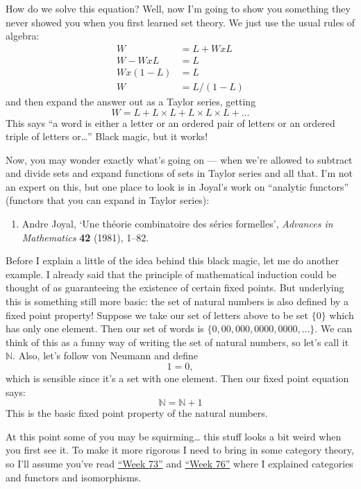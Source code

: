 \documentclass{article}
\def\tightlist{}
\begin{document}
How do we solve this equation? Well, now I'm going to show you something
they never showed you when you first learned set theory. We just use the
usual rules of algebra: \[
  \begin{aligned}
    W &= L + W x L
  \\W - W x L &= L
  \\W x (1 - L) &= L
  \\W &= L/(1 - L)
  \end{aligned}
\] and then expand the answer out as a Taylor series, getting
\[W = L + L\times L + L\times L\times L + \ldots\] This says ``a word is
either a letter or an ordered pair of letters or an ordered triple of
letters or\ldots{}'' Black magic, but it works!

Now, you may wonder exactly what's going on --- when we're allowed to
subtract and divide sets and expand functions of sets in Taylor series
and all that. I'm not an expert on this, but one place to look is in
Joyal's work on ``analytic functors'' (functors that you can expand in
Taylor series):

\begin{enumerate}
\def\labelenumi{\arabic{enumi})}
\setcounter{enumi}{2}
\tightlist
\item
  Andre Joyal, `Une théorie combinatoire des séries formelles',
  \emph{Advances in Mathematics} \textbf{42} (1981), 1--82.
\end{enumerate}

Before I explain a little of the idea behind this black magic, let me do
another example. I already said that the principle of mathematical
induction could be thought of as guaranteeing the existence of certain
fixed points. But underlying this is something still more basic: the set
of natural numbers is also defined by a fixed point property! Suppose we
take our set of letters above to be set \(\{0\}\) which has only one
element. Then our set of words is \(\{0,00,000,0000,0000,\ldots\}\). We
can think of this as a funny way of writing the set of natural numbers,
so let's call it \(\mathbb{N}\). Also, let's follow von Neumann and
define \[1 = {0},\] which is sensible since it's a set with one element.
Then our fixed point equation says: \[\mathbb{N} = \mathbb{N} + 1\] This
is the basic fixed point property of the natural numbers.

At this point some of you may be squirming\ldots{} this stuff looks a
bit weird when you first see it. To make it more rigorous I need to
bring in some category theory, so I'll assume you've read
\protect\hyperlink{week73}{``Week 73''} and
\protect\hyperlink{week76}{``Week 76''} where I explained categories and
functors and isomorphisms.
\end{document}
